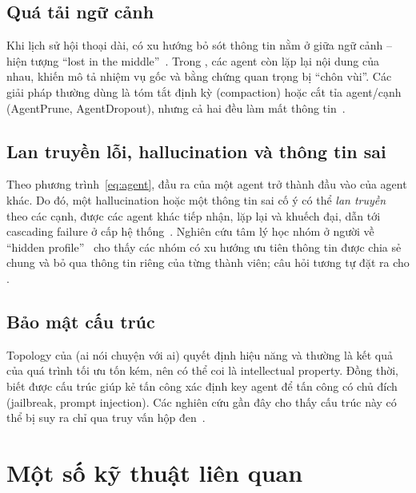 \subsection{Quá tải ngữ cảnh}
Khi lịch sử hội thoại dài, \LLM{} có xu hướng bỏ sót thông tin nằm ở giữa ngữ cảnh -- hiện tượng ``lost in the middle''~\cite{lostmiddle}. Trong \MAS{}, các agent còn lặp lại nội dung của nhau, khiến mô tả nhiệm vụ gốc và bằng chứng quan trọng bị ``chôn vùi''. Các giải pháp thường dùng là tóm tắt định kỳ (compaction) hoặc cắt tỉa agent/cạnh (AgentPrune, AgentDropout), nhưng cả hai đều làm mất thông tin~\cite{p8radar}.

\subsection{Lan truyền lỗi, hallucination và thông tin sai}
Theo phương trình~\eqref{eq:agent}, đầu ra của một agent trở thành đầu vào của agent khác. Do đó, một hallucination hoặc một thông tin sai cố ý có thể \emph{lan truyền} theo các cạnh, được các agent khác tiếp nhận, lặp lại và khuếch đại, dẫn tới cascading failure ở cấp hệ thống~\cite{p5halluprop,p4tide}. Nghiên cứu tâm lý học nhóm ở người về ``hidden profile''~\cite{stasser1985} cho thấy các nhóm có xu hướng ưu tiên thông tin được chia sẻ chung và bỏ qua thông tin riêng của từng thành viên; câu hỏi tương tự đặt ra cho \MAS.

\subsection{Bảo mật cấu trúc}
Topology của \MAS{} (ai nói chuyện với ai) quyết định hiệu năng và thường là kết quả của quá trình tối ưu tốn kém, nên có thể coi là intellectual property. Đồng thời, biết được cấu trúc giúp kẻ tấn công xác định key agent để tấn công có chủ đích (jailbreak, prompt injection). Các nghiên cứu gần đây cho thấy cấu trúc này có thể bị suy ra chỉ qua truy vấn hộp đen~\cite{p1mirage}.

\section{Một số kỹ thuật liên quan}

